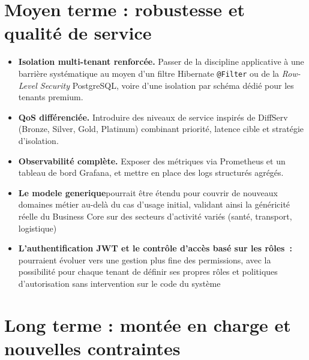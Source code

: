\section{Moyen terme : robustesse et qualité de service}

\begin{itemize}
  \item \textbf{Isolation multi-tenant renforcée.} Passer de la discipline applicative à
        une barrière systématique au moyen d'un filtre Hibernate \texttt{@Filter} ou de la
        \emph{Row-Level Security} PostgreSQL, voire d'une isolation par schéma dédié pour
        les tenants premium.
  \item \textbf{QoS différenciée.} Introduire des niveaux de service inspirés de DiffServ
        (Bronze, Silver, Gold, Platinum) combinant priorité, latence cible et stratégie
        d'isolation.
  \item \textbf{Observabilité complète.} Exposer des métriques via Prometheus et un tableau
        de bord Grafana, et mettre en place des logs structurés agrégés.

  \item \textbf{Le modele generique}pourrait être étendu pour couvrir de nouveaux domaines métier au-delà du cas d'usage initial, validant ainsi la généricité réelle du Business Core sur des secteurs d'activité variés (santé, transport, logistique)

  \item \textbf{L'authentification JWT et le contrôle d'accès basé sur les rôles :} pourraient évoluer vers une gestion plus fine des permissions, avec la possibilité pour chaque tenant de définir ses propres rôles et politiques d'autorisation sans intervention sur le code du système
\end{itemize}

\section{Long terme : montée en charge et nouvelles contraintes}

